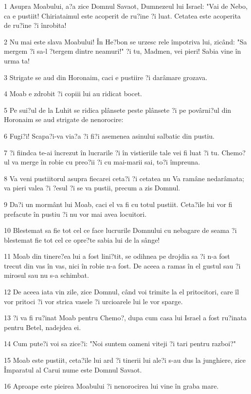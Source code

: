 \par 1 Asupra Moabului, a?a zice Domnul Savaot, Dumnezeul lui Israel: "Vai de Nebo, ca e pustiit! Chiriataimul este acoperit de ru?ine ?i luat. Cetatea este acoperita de ru?ine ?i înrobita!
\par 2 Nu mai este slava Moabului! În He?bon se urzesc rele împotriva lui, zicând: "Sa mergem ?i sa-l ?tergem dintre neamuri!" ?i tu, Madmen, vei pieri! Sabia vine în urma ta!
\par 3 Strigate se aud din Horonaim, caci e pustiire ?i darâmare grozava.
\par 4 Moab e zdrobit ?i copiii lui au ridicat bocet.
\par 5 Pe sui?ul de la Luhit se ridica plânsete peste plânsete ?i pe povârni?ul din Horonaim se aud strigate de nenorocire:
\par 6 Fugi?i! Scapa?i-va via?a ?i fi?i asemenea asinului salbatic din pustiu.
\par 7 ?i fiindca te-ai încrezut în lucrarile ?i în vistieriile tale vei fi luat ?i tu. Chemo?ul va merge în robie cu preo?ii ?i cu mai-marii sai, to?i împreuna.
\par 8 Va veni pustiitorul asupra fiecarei ceta?i ?i cetatea nu Va ramâne nedarâmata; va pieri valea ?i ?esul ?i se va pustii, precum a zis Domnul.
\par 9 Da?i un mormânt lui Moab, caci el va fi cu totul pustiit. Ceta?ile lui vor fi prefacute în pustiu ?i nu vor mai avea locuitori.
\par 10 Blestemat sa fie tot cel ce face lucrurile Domnului cu nebagare de seama ?i blestemat fie tot cel ce opre?te sabia lui de la sânge!
\par 11 Moab din tinere?ea lui a fost lini?tit, se odihnea pe drojdia sa ?i n-a fost trecut din vas în vas, nici în robie n-a fost. De aceea a ramas în el gustul sau ?i mirosul sau nu s-a schimbat.
\par 12 De aceea iata vin zile, zice Domnul, când voi trimite la el pritocitori, care îl vor pritoci ?i vor strica vasele ?i urcioarele lui le vor sparge.
\par 13 ?i va fi ru?inat Moab pentru Chemo?, dupa cum casa lui Israel a fost ru?inata pentru Betel, nadejdea ei.
\par 14 Cum pute?i voi sa zice?i: "Noi suntem oameni viteji ?i tari pentru razboi?"
\par 15 Moab este pustiit, ceta?ile lui ard ?i tinerii lui ale?i s-au dus la junghiere, zice Împaratul al Carui nume este Domnul Savaot.
\par 16 Aproape este pieirea Moabului ?i nenorocirea lui vine în graba mare.
